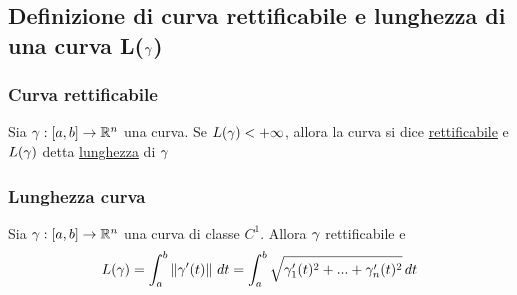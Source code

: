 \subsection{Definizione di curva rettificabile e lunghezza di una curva L($\gamma$)}
\subsubsection{Curva rettificabile}
\begin{definition}
  Sia $\gamma:[a,b]\to\mathbb{R}^n$ una curva. Se $L(\gamma) < +\infty$, allora la curva si dice
  \underline{rettificabile} e $L(\gamma)$ \ace detta \underline{lunghezza} di $\gamma$
\end{definition}
\subsubsection{Lunghezza curva}
\begin{theorem}
  \label{lunghezzacurva}
  Sia $\gamma:[a,b]\to\mathbb{R}^n$ una curva di classe $C^1$. Allora $\gamma$ \ace rettificabile e 
  $$L(\gamma)= \int_{a}^{b} \left\lVert\gamma'(t)\right\rVert \,dt = \int_{a}^{b} \sqrt{\gamma_1'(t)^2 + ... + \gamma_n'(t)^2}\,dt$$
\end{theorem}
